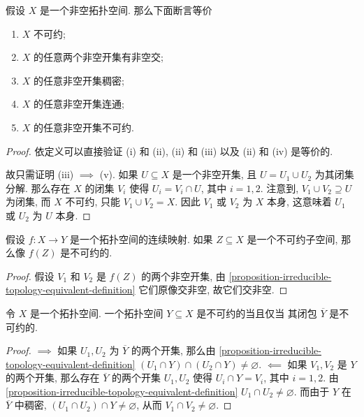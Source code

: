 \begin{proposition}
  \label{proposition-irreducible-topology-equivalent-definition}
  假设 \( X \) 是一个非空拓扑空间. 那么下面断言等价
  \begin{enumerate}
    \item \( X \) 不可约;
    \item \( X \) 的任意两个非空开集有非空交;
    \item \( X \) 的任意非空开集稠密;
    \item \( X \) 的任意非空开集连通;
    \item \( X \) 的任意非空开集不可约.
  \end{enumerate}
\end{proposition}
\begin{proof}
  依定义可以直接验证 (i) 和 (ii), (ii) 和 (iii) 以及 (ii) 和 (iv) 是等价的.

  故只需证明 (iii) \( \implies \) (v). 如果 \( U \subseteq X \) 是一个非空开集,
  且 \( U = U_1 \cup U_2 \) 为其闭集分解. 那么存在 \( X \) 的闭集 \( V_i \) 使得
  \( U_i = V_i \cap U \), 其中 \( i = 1, 2 \). 注意到, \( V_1 \cup V_2 \supseteq
  U \) 为闭集, 而 \( X \) 不可约, 只能 \( V_1 \cup V_2 = X \). 因此 \( V_1 \) 或
  \( V_2 \) 为 \( X \) 本身, 这意味着 \( U_1 \) 或 \( U_2 \) 为 \( U \) 本身.
\end{proof}

\begin{corollary}
  假设 \( f: X \to Y \) 是一个拓扑空间的连续映射. 如果 \( Z \subseteq X \)
  是一个不可约子空间, 那么像 \( f(Z) \) 是不可约的.
\end{corollary}
\begin{proof}
  假设 \( V_1 \) 和 \( V_2 \) 是 \( f(Z) \) 的两个非空开集, 由
  \cref{proposition-irreducible-topology-equivalent-definition} 它们原像交非空,
  故它们交非空.
\end{proof}

\begin{lemma}
  \label{lemma-irreducible-iff-closure}
  令 \( X \) 是一个拓扑空间. 一个拓扑空间 \( Y \subseteq X \) 是不可约的当且仅当
  其闭包 \( \overline{Y} \) 是不可约的.
\end{lemma}
\begin{proof}
  \( \implies \) 如果 \( U_1, U_2 \) 为 \( \overline{Y} \) 的两个开集, 那么由
  \cref{proposition-irreducible-topology-equivalent-definition} \( (U_1 \cap Y)
  \cap (U_2 \cap Y) \neq \varnothing \). \( \impliedby \) 如果 \( V_1, V_2 \) 是
  \( Y \) 的两个开集, 那么存在 \( \overline{Y} \) 的两个开集 \( U_1, U_2 \) 使得
  \( U_i \cap Y = V_i \), 其中 \( i = 1, 2 \). 由
  \cref{proposition-irreducible-topology-equivalent-definition} \( U_1 \cap U_2
  \neq \varnothing \). 而由于 \( Y \) 在 \( \overline{Y} \) 中稠密, \( (U_1 \cap
  U_2) \cap Y \neq \varnothing \), 从而 \( V_1 \cap V_2 \neq \varnothing \).
\end{proof}

